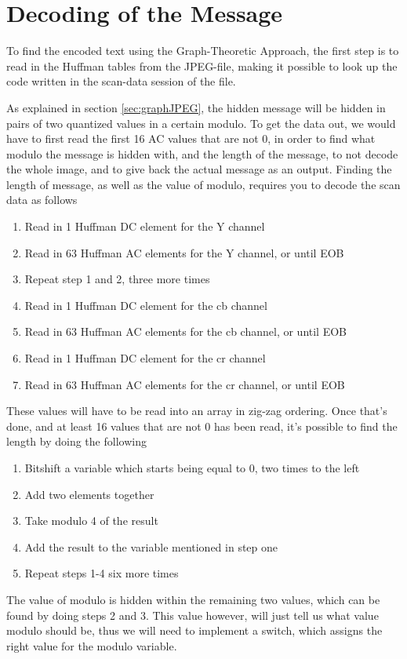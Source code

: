 \section{Decoding of the Message}
To find the encoded text using the Graph-Theoretic Approach, the first step is to read in the Huffman tables from the JPEG-file, making it possible to look up the code written in the scan-data session of the file. 

As explained in section \ref{sec:graphJPEG}, the hidden message will be hidden in pairs of two quantized values in a certain modulo.
To get the data out, we would have to first read the first 16 AC values that are not 0, in order to find what modulo the message is hidden with, and the length of the message, to not decode the whole image, and to give back the actual message as an output.
Finding the length of message, as well as the value of modulo, requires you to decode the scan data as follows
\begin{enumerate}
	\item Read in 1 Huffman DC element for the Y channel
	\item Read in 63 Huffman AC elements for the Y channel, or until EOB
	\item Repeat step 1 and 2, three more times
	\item Read in 1 Huffman DC element for the cb channel
	\item Read in 63 Huffman AC elements for the cb channel, or until EOB
	\item Read in 1 Huffman DC element for the cr channel
	\item Read in 63 Huffman AC elements for the cr channel, or until EOB
\end{enumerate}
These values will have to be read into an array in zig-zag ordering.
Once that's done, and at least 16 values that are not 0 has been read, it's possible to find the length by doing the following
\begin{enumerate}
	\item Bitshift a variable which starts being equal to 0, two times to the left
	\item Add two elements together
	\item Take modulo 4 of the result
	\item Add the result to the variable mentioned in step one
	\item Repeat steps 1-4 six more times
\end{enumerate}
The value of modulo is hidden within the remaining two values, which can be found by doing steps 2 and 3. This value however, will just tell us what value modulo should be, thus we will need to implement a switch, which assigns the right value for the modulo variable.
